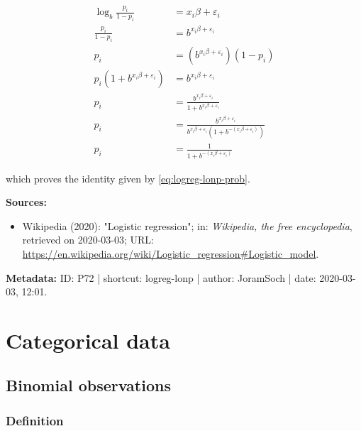 \documentclass[a4paper,12pt,twoside]{book}
\begin{document}
\begin{equation} \label{eq:logreg-lonp-prob-qed}
\begin{split}
\log_b \frac{p_i}{1-p_i} &= x_i \beta + \varepsilon_i \\
\frac{p_i}{1-p_i} &= b^{x_i \beta + \varepsilon_i} \\
p_i &= \left( b^{x_i \beta + \varepsilon_i} \right) (1-p_i) \\
p_i \left( 1 + b^{x_i \beta + \varepsilon_i} \right) &= b^{x_i \beta + \varepsilon_i} \\
p_i &= \frac{b^{x_i \beta + \varepsilon_i}}{1 + b^{x_i \beta + \varepsilon_i}} \\
p_i &= \frac{b^{x_i \beta + \varepsilon_i}}{b^{x_i \beta + \varepsilon_i} \left( 1 + b^{-(x_i \beta + \varepsilon_i)} \right)} \\
p_i &= \frac{1}{1 + b^{-(x_i \beta + \varepsilon_i)}}
\end{split}
\end{equation}

which proves the identity given by \eqref{eq:logreg-lonp-prob}.


\vspace{1em}
\textbf{Sources:}
\begin{itemize}
\item Wikipedia (2020): "Logistic regression"; in: \textit{Wikipedia, the free encyclopedia}, retrieved on 2020-03-03; URL: \url{https://en.wikipedia.org/wiki/Logistic_regression#Logistic_model}.
\end{itemize}


\vspace{1em}
\textbf{Metadata:} ID: P72 | shortcut: logreg-lonp | author: JoramSoch | date: 2020-03-03, 12:01.
\vspace{1em}



\pagebreak
\section{Categorical data}

\subsection{Binomial observations}

\subsubsection[\textit{Definition}]{Definition} \label{sec:bin-data}
\setcounter{equation}{0}
\end{document}
